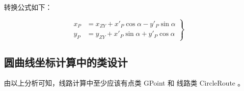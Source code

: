 转换公式如下：

\begin{equation}
    \left .
    \begin{aligned}
        x_{P} & = x_{ZY} + x'_P \cos \alpha - y'_P \sin \alpha \\
        y_{P} & = y_{ZY} + x'_P \sin \alpha + y'_P \cos \alpha
    \end{aligned}
    \right \}
    \label{eq:routexytoxy}
\end{equation}


\subsection{圆曲线坐标计算中的类设计}

由以上分析可知，线路计算中至少应该有点类 GPoint 和 线路类 CircleRoute 。

